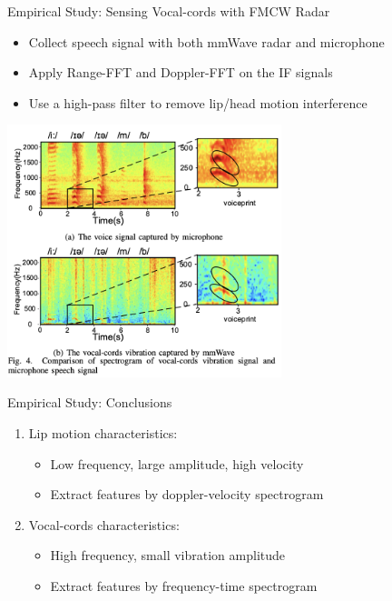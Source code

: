 \documentclass[dvipsnames, handout]{beamer}
\newcommand{\1}{\mathds{1}}	%
\begin{document}
\begin{frame}[t]{Empirical Study: Sensing Vocal-cords with FMCW Radar}

\begin{itemize}
\item Collect speech signal with both mmWave radar and microphone
\item Apply Range-FFT and Doppler-FFT on the IF signals
\item Use a high-pass filter to remove lip/head motion interference
\end{itemize}

\begin{center}
\includegraphics[width=0.6\textwidth]{imgs/mmmic-fig4.png}
\end{center}

\end{frame}


\begin{frame}[t]{Empirical Study: Conclusions}

\begin{enumerate}
\item Lip motion characteristics:
\begin{itemize}
\item Low frequency, large amplitude, high velocity
\item Extract features by doppler-velocity spectrogram
\end{itemize}
\item Vocal-cords characteristics: 
\begin{itemize}
\item High frequency, small vibration amplitude
\item Extract features by frequency-time spectrogram
\end{itemize}
\end{enumerate}

\end{frame}
\end{document}
